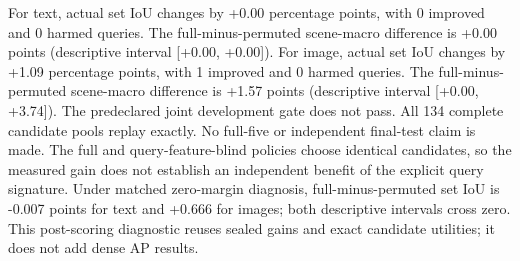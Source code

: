 For text, actual set IoU changes by +0.00 percentage points, with 0 improved and 0 harmed queries. The full-minus-permuted scene-macro difference is +0.00 points (descriptive interval [+0.00, +0.00]).
For image, actual set IoU changes by +1.09 percentage points, with 1 improved and 0 harmed queries. The full-minus-permuted scene-macro difference is +1.57 points (descriptive interval [+0.00, +3.74]).
The predeclared joint development gate does not pass. All 134 complete candidate pools replay exactly. No full-five or independent final-test claim is made.
The full and query-feature-blind policies choose identical candidates, so the measured gain does not establish an independent benefit of the explicit query signature.
Under matched zero-margin diagnosis, full-minus-permuted set IoU is -0.007 points for text and +0.666 for images; both descriptive intervals cross zero. This post-scoring diagnostic reuses sealed gains and exact candidate utilities; it does not add dense AP results.
